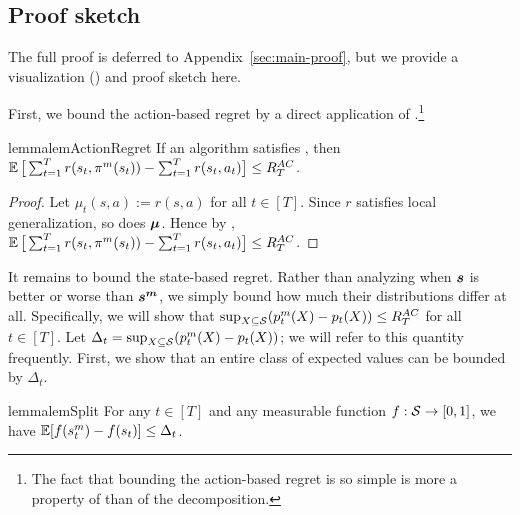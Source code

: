 \subsection{Proof sketch}



The full proof is deferred to Appendix~\ref{sec:main-proof}, but we provide a visualization () and proof sketch here. 

First, we bound the action-based regret by a direct application of .\footnote{The fact that bounding the action-based regret is so simple is more a property of  than of the decomposition.}

\begin{restatable}{lemma}{lemActionRegret}
\label{lem:action-regret}
If an algorithm satisfies , then $\operatorname*{\mathbb{E}} \big[\sum_{t=1}^T r(s_t, \pi^m(s_t)) - \sum_{t=1}^Tr(s_t, a_t)\big] \le  R_T^{AC}$.
\end{restatable}

\begin{proof}
Let $\mu_t(s,a) := r(s,a)$ for all $t \in [T]$. Since $r$ satisfies local generalization, so does $\boldsymbol{\mu}$. Hence by  , $\operatorname*{\mathbb{E}} \big[\sum_{t=1}^T r(s_t, \pi^m(s_t)) - \sum_{t=1}^T r(s_t, a_t)\big] \le  R_T^{AC}$.
\end{proof}

It remains to bound the state-based regret. Rather than analyzing when $\boldsymbol{s}$ is better or worse than $\boldsymbol{s^m}$, we simply bound how much their distributions differ at all. Specifically, we will show that $\sup_{X\subseteq \mathcal{S}}(p_t^m(X) - p_t(X)) \le R_T^{AC}$ for all $t \in [T]$. Let $\Delta_t = \sup_{X\subseteq \mathcal{S}}(p_t^m(X) - p_t(X))$; we will refer to this quantity frequently. 
First, we show that an entire class of expected values can be bounded by $\Delta_t$.


\begin{restatable}{lemma}{lemSplit}
\label{lem:split}
For any $t \in [T]$ and any measurable function $f: \mathcal{S} \to [0,1]$,  we have $\operatorname*{\mathbb{E}}[f(s_t^m) - f(s_t)] \le \Delta_t$.
\end{restatable}

